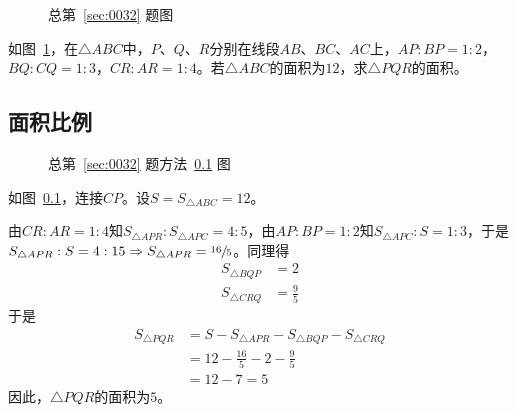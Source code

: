 

\begin{figure}[htbp]
  \centering
  \caption{总第~\ref{sec:0032} 题图} \label{fig:0032}
\end{figure}

如图~\ref{fig:0032}，在$\triangle ABC$中，$P$、$Q$、$R$分别在线段$AB$、$BC$、$AC$上，$AP:BP = 1:2$，$BQ:CQ = 1:3$，$CR:AR = 1:4$。若$\triangle ABC$的面积为$12$，求$\triangle PQR$的面积。


\subsection{面积比例} \label{subsec:0032-rat}

\begin{figure}[htbp]
  \centering
  \caption{总第~\ref{sec:0032} 题方法~\ref{subsec:0032-rat} 图}
  \label{fig:0032-rat}
\end{figure}

如图~\ref{subsec:0032-rat}，连接$CP$。设$S = S_{\triangle ABC} = 12$。

由$CR:AR = 1:4$知$S_{\triangle APR}:S_{\triangle APC} = 4:5$，由$AP:BP = 1:2$知$S_{\triangle APC}:S = 1:3$，于是$S_{\triangle APR}:S = 4:15 \Rightarrow S_{\triangle APR} = \sfrac{16}5$。同理得
\begin{align*}
  S_{\triangle BQP} &= 2 \\
  S_{\triangle CRQ} &= \frac95
\end{align*}
于是
\begin{align*}
  S_{\triangle PQR} &= S - S_{\triangle APR} - S_{\triangle BQP} - S_{\triangle CRQ} \\
  &= 12 - \frac{16}5 - 2 - \frac95 \\
  &= 12 - 7 = 5
\end{align*}
因此，$\triangle PQR$的面积为$5$。
